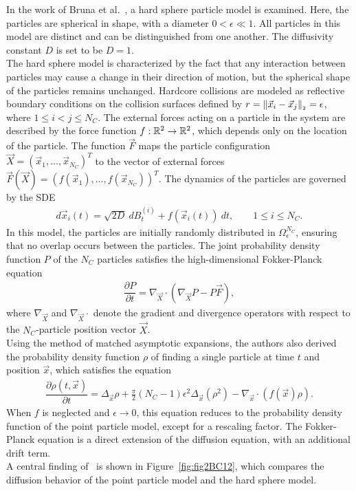 In the work of Bruna et al.~\cite{Bruna2012}, a hard sphere particle model is examined.
Here, the particles are spherical in shape, with a diameter $0 < \epsilon \ll 1$.
All particles in this model are distinct and can be distinguished from one another. 
The diffusivity constant $D$ is set to be $D=1$. \\
The hard sphere model is characterized by the fact that any interaction between particles may cause a change in their direction of motion, but the spherical shape of the particles remains unchanged.
Hardcore collisions are modeled as reflective boundary conditions on the collision surfaces defined by $r = \norm[\vec{x}_i - \vec{x}_j] = \epsilon$, where $1 \leq i < j \leq N_C$.
The external forces acting on a particle in the system are described by the force function $f: \mathbb{R}^2 \rightarrow \mathbb{R}^2$, which depends only on the location of the particle.
The function $\vec{F}$ maps the particle configuration $\vec{X} = (\vec{x}_1, \ldots, \vec{x}_{N_C})^T$ to the vector of external forces $\vec{F}(\vec{X}) = (f(\vec{x}_1), \ldots, f(\vec{x}_{N_C}))^T$.
The dynamics of the particles are governed by the SDE
\begin{align*}
	d\vec{x}_i(t) = \sqrt{2D} \: dB_t^{(i)} + f(\vec{x}_i(t)) \: dt, \qquad 1 \leq i \leq N_C.
\end{align*}
In this model, the particles are initially randomly distributed in $\Omega^{N_C}_{\epsilon}$, ensuring that no overlap occurs between the particles.
The joint probability density function $P$ of the $N_C$ particles satisfies the high-dimensional Fokker-Planck equation
\begin{align*}
	\dfrac{\partial P}{\partial t} = \nabla_{\vec{X}} \cdot ( \nabla_{\vec{X}} P - P \vec{F}),
\end{align*}
where $\nabla_{\vec{X}}$ and $\nabla_{\vec{X}} \cdot$ denote the gradient and divergence operators with respect to the $N_C$-particle position vector $\vec{X}$.\\
Using the method of matched asymptotic expansions, the authors also derived the probability density function $\rho$ of finding a single particle at time $t$ and position $\vec{x}$, which satisfies the equation
\begin{align}
	\dfrac{\partial \rho (t, \vec{x})}{\partial t} = \Delta_{\vec{x}} \rho + \frac{\pi}{2} (N_C - 1) \epsilon^2 \Delta_{\vec{x}} (\rho^2) - \nabla_{\vec{x}} \cdot (f(\vec{x}) \rho).
	\label{equ:hardsphere}
\end{align}
When $f$ is neglected and $\epsilon \rightarrow 0$, this equation reduces to the probability density function of the point particle model, except for a rescaling factor.
The Fokker-Planck equation is a direct extension of the diffusion equation, with an additional drift term.\\
A central finding of~\cite{Bruna2012} is shown in Figure~\ref{fig:fig2BC12}, which compares the diffusion behavior of the point particle model and the hard sphere model. \\

